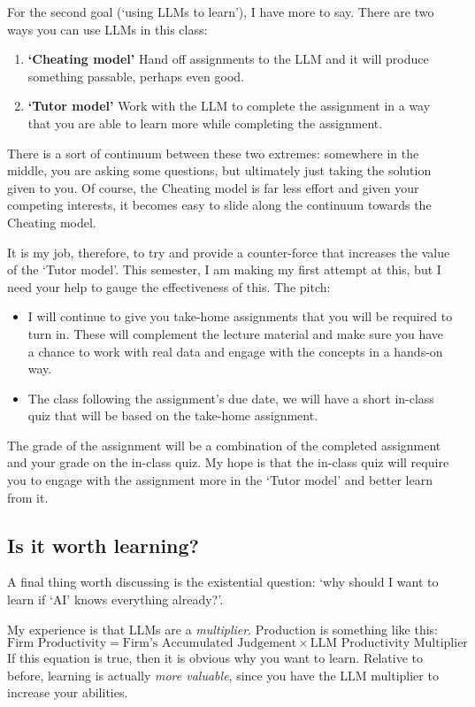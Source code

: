 \documentclass[12pt]{article}
\begin{document}
For the second goal (`using LLMs to learn'), I have more to say.  
There are two ways you can use LLMs in this class:
\begin{enumerate}
  \item \textbf{`Cheating model'} Hand off assignments to the LLM and it will produce something passable, perhaps even good.
  
  \item \textbf{`Tutor model'} Work with the LLM to complete the assignment in a way that you are able to learn more while completing the assignment. 
\end{enumerate}
There is a sort of continuum between these two extremes: somewhere in the middle, you are asking some questions, but ultimately just taking the solution given to you. 
Of course, the Cheating model is far less effort and given your competing interests, it becomes easy to slide along the continuum towards the Cheating model.

It is my job, therefore, to try and provide a counter-force that increases the value of the `Tutor model'. 
This semester, I am making my first attempt at this, but I need your help to gauge the effectiveness of this. 
The pitch: 
\begin{itemize}
  \item I will continue to give you take-home assignments that you will be required to turn in. 
  These will complement the lecture material and make sure you have a chance to work with real data and engage with the concepts in a hands-on way. 

  \item The class following the assignment's due date, we will have a short in-class quiz that will be based on the take-home assignment. 
\end{itemize}
The grade of the assignment will be a combination of the completed assignment and your grade on the in-class quiz. 
My hope is that the in-class quiz will require you to engage with the assignment more in the `Tutor model' and better learn from it.


\subsection*{Is it worth learning?}

A final thing worth discussing is the existential question: `why should I want to learn if `AI' knows everything already?'. 

My experience is that LLMs are a \emph{multiplier}. 
Production is something like this:
$$
  \text{Firm Productivity} = \text{Firm's Accumulated Judgement} \times \text{LLM Productivity Multiplier}
$$
If this equation is true, then it is obvious why you want to learn. 
Relative to before, learning is actually \emph{more valuable}, since you have the LLM multiplier to increase your abilities.
\end{document}
